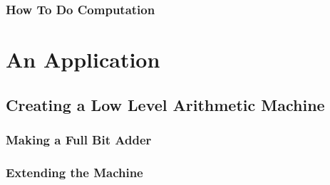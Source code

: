 \documentclass{article}
\begin{document}
    \subsubsection*{How To Do Computation}
    
  \newpage

  \section{An Application}
    \subsection{Creating a Low Level Arithmetic Machine}
      \subsubsection*{Making a Full Bit Adder}

      \subsubsection*{Extending the Machine}
\end{document}
